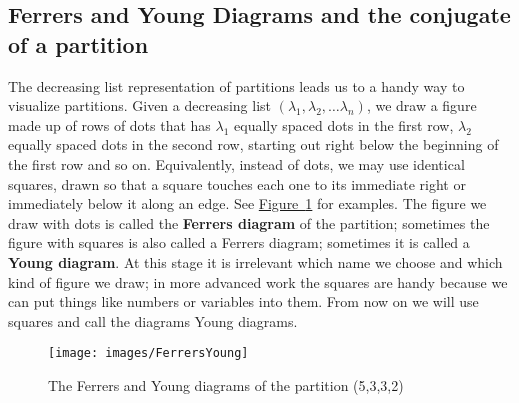 \documentclass[10pt,]{book}
\newcommand{\terminology}[1]{\textbf{#1}}
\theoremstyle{plain}
\theoremstyle{definition}
\theoremstyle{definition}
\numberwithin{equation}{chapter}
\begin{document}
\subsection[{Ferrers and Young Diagrams and the conjugate of a partition}]{Ferrers and Young Diagrams and the conjugate of a partition}\label{subsection-32}
The decreasing list representation of partitions leads us to a handy way to visualize partitions. Given a decreasing list \((\lambda_1,\lambda_2,\ldots \lambda_n)\), we draw a figure made up of rows of dots that has \(\lambda_1\) equally spaced dots in the first row, \(\lambda_2\) equally spaced dots in the second row, starting out right below the beginning of the first row and so on. Equivalently, instead of dots, we may use identical squares, drawn so that a square touches each one to its immediate right or immediately below it along an edge. See \hyperref[FerrersYoung]{Figure~\ref{FerrersYoung}} for examples. The figure we draw with dots is called the \terminology{Ferrers diagram} of the partition; sometimes the figure with squares is also called a Ferrers diagram; sometimes it is called a \terminology{Young diagram}. At this stage it is irrelevant which name we choose and which kind of figure we draw; in more advanced work the squares are handy because we can put things like numbers or variables into them.  From now on we will use squares and call the diagrams Young diagrams.%
\begin{figure}
\centering
\texttt{[image: images/FerrersYoung]}
\caption{The Ferrers and Young diagrams of the partition (5,3,3,2)\label{FerrersYoung}}
\end{figure}
\end{document}
